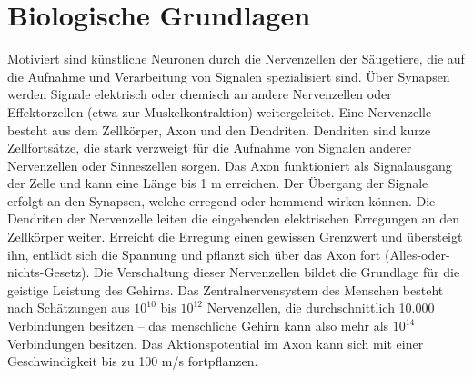 
\chapter{Biologische Grundlagen}
\label{chapter-basics}

Motiviert sind künstliche Neuronen durch die Nervenzellen der Säugetiere, die auf die Aufnahme und Verarbeitung von Signalen spezialisiert sind. Über Synapsen werden Signale elektrisch oder chemisch an andere Nervenzellen oder Effektorzellen (etwa zur Muskelkontraktion) weitergeleitet. Eine Nervenzelle besteht aus dem Zellkörper, Axon und den Dendriten. Dendriten sind kurze Zellfortsätze, die stark verzweigt für die Aufnahme von Signalen anderer Nervenzellen oder Sinneszellen sorgen. Das Axon funktioniert als Signalausgang der Zelle und kann eine Länge bis 1 m erreichen. Der Übergang der Signale erfolgt an den Synapsen, welche erregend oder hemmend wirken können. Die Dendriten der Nervenzelle leiten die eingehenden elektrischen Erregungen an den Zellkörper weiter. Erreicht die Erregung einen gewissen Grenzwert und übersteigt ihn, entlädt sich die Spannung und pflanzt sich über das Axon fort (Alles-oder-nichts-Gesetz). Die Verschaltung dieser Nervenzellen bildet die Grundlage für die geistige Leistung des Gehirns. Das Zentralnervensystem des Menschen besteht nach Schätzungen aus $10^{10}$ bis $10^{12}$ Nervenzellen, die durchschnittlich 10.000 Verbindungen besitzen – das menschliche Gehirn kann also mehr als $10^{14}$ Verbindungen besitzen.\cite{neuroa} Das Aktionspotential im Axon kann sich mit einer Geschwindigkeit bis zu 100 m/s fortpflanzen. 
